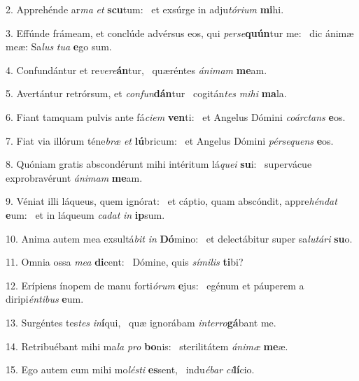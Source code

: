 2. Apprehénde ar\textit{ma} \textit{et} \textbf{scu}tum: \ast\  et exsúrge in adju\textit{tó}\textit{ri}\textit{um} \textbf{mi}hi.\

3. Effúnde frámeam, et conclúde advérsus eos, qui \textit{per}\textit{se}\textbf{quún}tur me: \ast\  dic ánimæ meæ: Sa\textit{lus} \textit{tu}\textit{a} \textbf{e}go sum.\

4. Confundántur et re\textit{ve}\textit{re}\textbf{án}tur, \ast\  quæréntes \textit{á}\textit{ni}\textit{mam} \textbf{me}am.\

5. Avertántur retrórsum, et \textit{con}\textit{fun}\textbf{dán}tur \ast\  cogitán\textit{tes} \textit{mi}\textit{hi} \textbf{ma}la.\

6. Fiant tamquam pulvis ante fá\textit{ci}\textit{em} \textbf{ven}ti: \ast\  et Angelus Dómini \textit{co}\textit{árc}\textit{tans} \textbf{e}os.\

7. Fiat via illórum téne\textit{bræ} \textit{et} \textbf{lú}bricum: \ast\  et Angelus Dómini \textit{pér}\textit{se}\textit{quens} \textbf{e}os.\

8. Quóniam gratis abscondérunt mihi intéritum lá\textit{que}\textit{i} \textbf{su}i: \ast\  supervácue exprobravérunt \textit{á}\textit{ni}\textit{mam} \textbf{me}am.\

9. Véniat illi láqueus, quem ignórat: \dag\  et cáptio, quam abscóndit, appre\textit{hén}\textit{dat} \textbf{e}um: \ast\  et in láqueum \textit{ca}\textit{dat} \textit{in} \textbf{ip}sum.\

10. Anima autem mea exsultá\textit{bit} \textit{in} \textbf{Dó}mino: \ast\  et delectábitur super sa\textit{lu}\textit{tá}\textit{ri} \textbf{su}o.\

11. Omnia ossa \textit{me}\textit{a} \textbf{di}cent: \ast\  Dómine, quis \textit{sí}\textit{mi}\textit{lis} \textbf{ti}bi?\

12. Erípiens ínopem de manu forti\textit{ó}\textit{rum} \textbf{e}jus: \ast\  egénum et páuperem a diripi\textit{én}\textit{ti}\textit{bus} \textbf{e}um.\

13. Surgéntes tes\textit{tes} \textit{in}\textbf{í}qui, \ast\  quæ ignorábam \textit{in}\textit{ter}\textit{ro}\textbf{gá}bant me.\

14. Retribuébant mihi ma\textit{la} \textit{pro} \textbf{bo}nis: \ast\  sterilitátem \textit{á}\textit{ni}\textit{mæ} \textbf{me}æ.\

15. Ego autem cum mihi mo\textit{lés}\textit{ti} \textbf{es}sent, \ast\  indu\textit{é}\textit{bar} \textit{ci}\textbf{lí}cio.\

